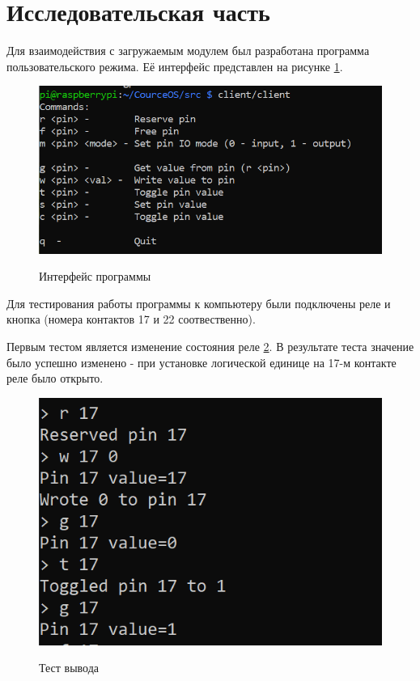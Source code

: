 \section{Исследовательская часть}

	Для взаимодействия с загружаемым модулем был разработана программа пользовательского режима. Её интерфейс представлен на рисунке \ref{demo:interface}.

	\begin{figure}[h!] 
		\begin{center}
			{\includegraphics[scale=1.2, angle=0]{img/interface.png}}
			\caption{Интерфейс программы}
			\label{demo:interface}
		\end{center}
	\end{figure}

	Для тестирования работы программы к компьютеру были подключены реле и кнопка (номера контактов 17 и 22 соотвественно).
	
	Первым тестом является изменение состояния реле \ref{demo:test1}. В результате теста значение было успешно изменено - при установке логической единице на 17-м контакте реле было открыто.
	
	\begin{figure}[h!] 
		\begin{center}
			{\includegraphics[scale=1.0, angle=0]{img/test1.png}}
			\caption{Тест вывода}
			\label{demo:test1}
		\end{center}
	\end{figure}

